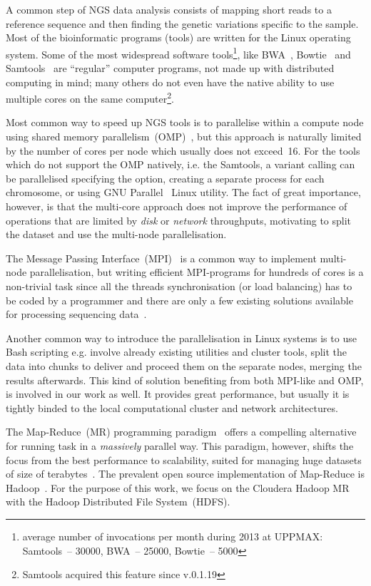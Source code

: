 \documentclass[11pt, oneside]{article}   	%
\begin{document}
A common step of NGS data analysis consists of mapping short reads to a reference sequence and then finding the genetic variations specific to the sample. Most of the bioinformatic programs (tools) are written for the Linux operating system. Some of the most widespread software tools\footnote{average number of invocations per month during 2013 at UPPMAX: Samtools~-- 30000, BWA~-- 25000, Bowtie~-- 5000}, like BWA~\cite{bwa}, Bowtie~\cite{bowtie} and Samtools~\cite{samtools} are ``regular'' computer programs, not made up with distributed computing in mind; many others do not even have the native ability to use multiple cores on the same computer\footnote{Samtools  acquired this feature since v.0.1.19}. 


Most common  way to speed up NGS tools is to parallelise within a compute node using shared memory parallelism~(OMP)~\cite{openmp}, but this approach is naturally limited by the number of cores per node which usually does not exceed~16.  For the tools which do not support the OMP natively, i.e.  the Samtools, a variant calling can be parallelised specifying the option, creating a separate process  for  each chromosome, or using GNU Parallel~\cite{gnuparallel} Linux utility.
The fact of great importance, however, is that the multi-core approach does not improve the performance of operations that are limited by {\it disk} or {\it network } throughputs, motivating to split  the dataset and  use the  multi-node parallelisation.

The Message Passing Interface~(MPI)~\cite{mpi1} is a common way to implement multi-node parallelisation, but writing efficient MPI-programs for hundreds of cores is a non-trivial task since all the threads synchronisation (or load balancing) has to be coded by a programmer and there are only a few existing solutions available for processing sequencing data~\cite{pmap, erne, gnumap}.  

Another common way to introduce the parallelisation in Linux systems is to use Bash scripting e.g. involve  already existing utilities and cluster tools, split the data into chunks to deliver and proceed them  on the separate nodes, merging the results afterwards. This kind of solution benefiting  from both MPI-like and OMP, is involved in our work as well. It provides great performance, but usually it is tightly binded to the local computational cluster and network architectures.  

The Map-Reduce~(MR) programming paradigm~\cite{hadoop} offers a compelling alternative for running task in a {\it massively} parallel way. This paradigm, however, shifts the focus from the best performance to scalability, suited for managing  huge datasets of size  of terabytes~\cite{lin2010}.
The prevalent open source implementation of Map-Reduce is Hadoop~\cite{hadoop,Hadoop:Guide}. 
For the purpose of this work, we focus on the Cloudera Hadoop MR with the Hadoop Distributed File System~(HDFS).
\end{document}
